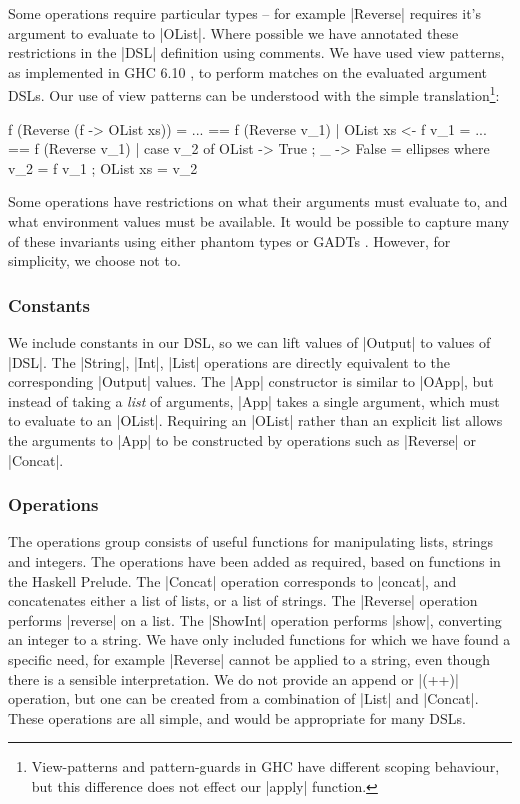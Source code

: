 \documentclass[preprint,draft]{sigplanconf}
\begin{document}
Some operations require particular types -- for example |Reverse| requires it's argument to evaluate to |OList|. Where possible we have annotated these restrictions in the |DSL| definition using comments. We have used view patterns, as implemented in GHC 6.10 \cite{ghc6_10}, to perform matches on the evaluated argument DSLs. Our use of view patterns can be understood with the simple translation\footnote{View-patterns and pattern-guards in GHC have different scoping behaviour, but this difference does not effect our |apply| function.}:

\ignore\begin{code}
f (Reverse (f -> OList xs)) = ...
    ==
f (Reverse v_1) | OList xs <- f v_1 = ...
    ==
f (Reverse v_1) | case v_2 of OList{} -> True ; _ -> False = ellipses
    where  v_2 = f v_1 ; OList xs = v_2
\end{code}

Some operations have restrictions on what their arguments must evaluate to, and what environment values must be available. It would be possible to capture many of these invariants using either phantom types \cite{fluet:phantom} or GADTs \cite{spj:gadt}. However, for simplicity, we choose not to.

\subsubsection{Constants}

We include constants in our DSL, so we can lift values of |Output| to values of |DSL|. The |String|, |Int|, |List| operations are directly equivalent to the corresponding |Output| values. The |App| constructor is similar to |OApp|, but instead of taking a \textit{list} of arguments, |App| takes a single argument, which must to evaluate to an |OList|. Requiring an |OList| rather than an explicit list allows the arguments to |App| to be constructed by operations such as |Reverse| or |Concat|.

\subsubsection{Operations}

The operations group consists of useful functions for manipulating lists, strings and integers. The operations have been added as required, based on functions in the Haskell Prelude. The |Concat| operation corresponds to |concat|, and concatenates either a list of lists, or a list of strings. The |Reverse| operation performs |reverse| on a list. The |ShowInt| operation performs |show|, converting an integer to a string. We have only included functions for which we have found a specific need, for example |Reverse| cannot be applied to a string, even though there is a sensible interpretation. We do not provide an append or |(++)| operation, but one can be created from a combination of |List| and |Concat|. These operations are all simple, and would be appropriate for many DSLs.
\end{document}
